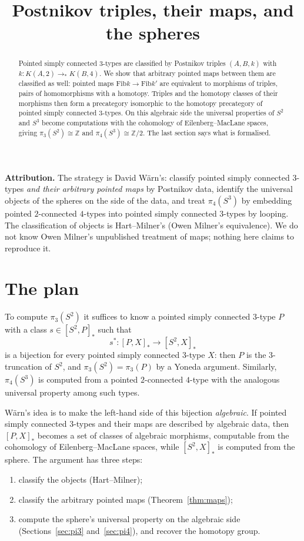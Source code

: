 \documentclass[11pt]{amsart}
\title[Postnikov triples, their maps, and the spheres]{Postnikov triples, their maps, and the spheres}
\date{}
\theoremstyle{remark}
\newcommand{\Fib}{\mathrm{Fib}}
\newcommand{\Z}{\mathbb{Z}}
\begin{document}
\begin{abstract}
Pointed simply connected $3$-types are classified by Postnikov triples
$(A,B,k)$ with $k:K(A,2)\to_*K(B,4)$. We show that arbitrary pointed maps
between them are classified as well: pointed maps $\Fib k\to\Fib k'$ are
equivalent to morphisms of triples, pairs of homomorphisms with a homotopy.
Triples and the homotopy classes of their morphisms then form a precategory
isomorphic to the homotopy precategory of pointed simply connected $3$-types.
On this algebraic side the universal properties of $S^2$ and $S^3$ become
computations with the cohomology of Eilenberg--MacLane spaces, giving
$\pi_3(S^2)\cong\Z$ and $\pi_4(S^3)\cong\Z/2$. The last section says what is
formalised.
\end{abstract}
\maketitle

\noindent\textbf{Attribution.} The strategy is David Wärn's: classify pointed
simply connected $3$-types \emph{and their arbitrary pointed maps} by Postnikov
data, identify the universal objects of the spheres on the side of the data,
and treat $\pi_4(S^3)$ by embedding pointed $2$-connected $4$-types into pointed
simply connected $3$-types by looping. The classification of objects is
Hart--Milner's (Owen Milner's equivalence). We do not know Owen Milner's
unpublished treatment of maps; nothing here claims to reproduce it.

\section{The plan}

To compute $\pi_3(S^2)$ it suffices to know a pointed simply connected $3$-type
$P$ with a class $s\in[S^2,P]_*$ such that
\[s^*:[P,X]_*\to[S^2,X]_*\]
is a bijection for every pointed simply connected $3$-type $X$: then $P$ is the
$3$-truncation of $S^2$, and $\pi_3(S^2)=\pi_3(P)$ by a Yoneda argument. Similarly,
$\pi_4(S^3)$ is computed from a pointed $2$-connected $4$-type with the analogous
universal property among such types.

Wärn's idea is to make the left-hand side of this bijection \emph{algebraic}.
If pointed simply connected $3$-types and their maps are described by algebraic
data, then $[P,X]_*$ becomes a set of classes of algebraic morphisms, computable
from the cohomology of Eilenberg--MacLane spaces, while $[S^2,X]_*$ is computed
from the sphere. The argument has three steps:
\begin{enumerate}
\item classify the objects (Hart--Milner);
\item classify the arbitrary pointed maps (Theorem~\ref{thm:maps});
\item compute the sphere's universal property on the algebraic side
(Sections~\ref{sec:pi3} and~\ref{sec:pi4}), and recover the homotopy group.
\end{enumerate}
\end{document}
